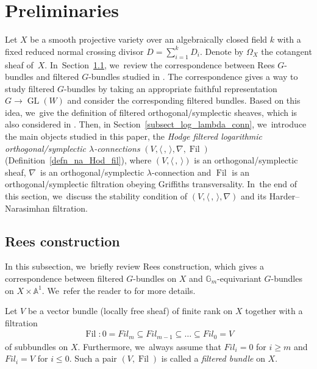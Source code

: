 \documentclass[11pt]{article}
\numberwithin{equation}{section}
\newcommand{\Fil}{\textit{Fil}}
\newcommand{\lconnection}{$\lambda$\nobreakdash-con\-nec\-tion\xspace}
\newcommand{\lconnections}{$\lambda$\nobreakdash-con\-nec\-tions\xspace}
\DeclareMathOperator{\Filt}{Fil}
\DeclareMathOperator{\GL}{GL}
\theoremstyle{plain}
\theoremstyle{definition}
\begin{document}
\section{Preliminaries}\label{sect_pre}

Let $X$ be a smooth projective variety over an algebraically closed field $k$ with a fixed reduced normal crossing divisor $D=\sum_{i=1}^{k}D_i$. Denote by $\Omega_X$ the cotangent sheaf of~$X$. In~Section~\ref{subsect_rees}, we~review the correspondence between Rees $G$-bundles and filtered $G$-bundles studied in \cite{Lo17a,Lo17b}. The correspondence gives a way to study filtered $G$-bundles by taking an appropriate faithful representation $G \to \GL(W)$ and consider the corresponding filtered bundles. Based on this idea, we~give the definition of filtered orthogonal/symplectic sheaves, which is also considered in \hbox{\cite[\S5]{GS03}}. Then, in Section~\ref{subsect_log_lambda_conn}, we~introduce the main objects studied in this paper, the \emph{Hodge filtered logarithmic orthogonal/symplectic \lconnections} $(V, \langle \,, \, \rangle, \nabla, \Filt)$ (Definition~\ref{defn_na_Hod_fil}), where $(V, \langle \,, \, \rangle)$ is an orthogonal/symplectic sheaf, $\nabla$~is an orthogonal/symplectic \lconnection and $\Filt$ is an orthogonal/symplectic filtration obeying Griffiths transversality. In~the end of this section, we~discuss the stability condition of $(V, \langle \,, \, \rangle, \nabla)$ and its Harder--Narasimhan filtration.

\subsection{Rees construction}\label{subsect_rees}
In this subsection, we~briefly review Rees construction, which gives a correspondence between filtered $G$-bundles on $X$ and $\mathbb{G}_m$-equivariant $G$-bundles on $X \times \mathbb{A}^1$. We~refer the reader to \cite{L13,Lo17a,Lo17b} for more details.

Let $V$ be a vector bundle (locally free sheaf) of finite rank on $X$ together with a filtration
\begin{align*}
\Filt: 0 = \Fil_m \subseteq \Fil_{m-1} \subseteq \dots \subseteq \Fil_0 = V
\end{align*}
of subbundles on $X$. Furthermore, we~always assume that $\Fil_i =0$ for $i \geq m$ and $\Fil_i = V$ for $i \leq 0$. Such a pair $(V,\Filt)$ is called a \emph{filtered bundle} on $X$.
\end{document}
